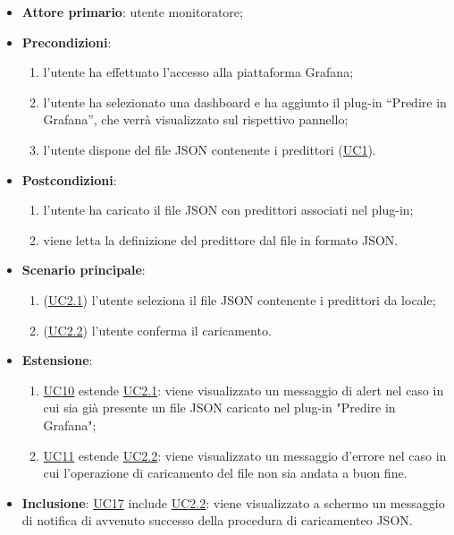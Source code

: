 		\begin{itemize}
			\item\textbf{Attore primario}: utente monitoratore;
			\item\textbf{Precondizioni}: 
				\begin{enumerate}
					\item l’utente ha effettuato l’accesso alla piattaforma Grafana;
					\item l’utente ha selezionato una dashboard e ha aggiunto il plug-in “Predire in Grafana”,  che verrà visualizzato sul rispettivo pannello;
					\item l’utente dispone del file JSON contenente i predittori (\hyperref[par:UC1]{UC1}). 
				\end{enumerate}
			\item\textbf{Postcondizioni}:
				\begin{enumerate}
					\item l’utente ha caricato il file JSON con predittori associati nel plug-in;
					\item viene letta la definizione del predittore dal file in formato JSON. 
				\end{enumerate}
			\item\textbf{Scenario principale}:
				\begin{enumerate}
					\item (\hyperref[par:UC2.1]{UC2.1}) l’utente seleziona il file JSON contenente i predittori da locale;
					\item (\hyperref[par:UC2.2]{UC2.2}) l'utente conferma il caricamento.
				\end{enumerate}
			\item\textbf{Estensione}:
				\begin{enumerate} 
					\item\hyperref[par:UC10]{UC10} estende \hyperref[par:UC2.1]{UC2.1}: viene visualizzato un messaggio di alert nel caso in cui sia già presente un file JSON caricato nel plug-in "Predire in Grafana";
					\item\hyperref[par:UC11]{UC11} estende \hyperref[par:UC2.2]{UC2.2}: viene visualizzato un messaggio d’errore nel caso in cui l’operazione di caricamento del file non sia andata a buon fine.
				\end{enumerate}	
			\item\textbf{Inclusione}: \hyperref[par:UC17]{UC17} include \hyperref[par:UC2.2]{UC2.2}: viene visualizzato a schermo un messaggio di notifica di avvenuto successo della procedura di caricamenteo JSON.
		\end{itemize}
		
